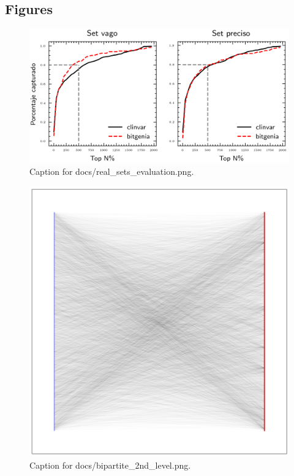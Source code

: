 \documentclass{article}
\begin{document}
\subsection{Figures}
\begin{figure}[h] \centering \includegraphics{docs/real_sets_evaluation.png} \caption{Caption for docs/real_sets_evaluation.png.} \end{figure}
\begin{figure}[h] \centering \includegraphics{docs/bipartite_2nd_level.png} \caption{Caption for docs/bipartite_2nd_level.png.} \end{figure}
\end{document}
